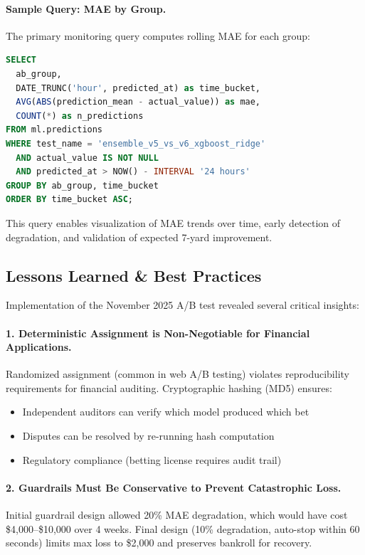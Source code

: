 \paragraph{Sample Query: MAE by Group.}
The primary monitoring query computes rolling MAE for each group:

\begin{lstlisting}[language=SQL, style=codestyle, caption={Grafana query for real-time MAE monitoring}]
SELECT
  ab_group,
  DATE_TRUNC('hour', predicted_at) as time_bucket,
  AVG(ABS(prediction_mean - actual_value)) as mae,
  COUNT(*) as n_predictions
FROM ml.predictions
WHERE test_name = 'ensemble_v5_vs_v6_xgboost_ridge'
  AND actual_value IS NOT NULL
  AND predicted_at > NOW() - INTERVAL '24 hours'
GROUP BY ab_group, time_bucket
ORDER BY time_bucket ASC;
\end{lstlisting}

This query enables visualization of MAE trends over time, early detection of degradation, and validation of expected 7-yard improvement.

\subsection{Lessons Learned \& Best Practices}

Implementation of the November 2025 A/B test revealed several critical insights:

\paragraph{1. Deterministic Assignment is Non-Negotiable for Financial Applications.}
Randomized assignment (common in web A/B testing) violates reproducibility requirements for financial auditing. Cryptographic hashing (MD5) ensures:
\begin{itemize}[itemsep=2pt,parsep=0pt]
    \item Independent auditors can verify which model produced which bet
    \item Disputes can be resolved by re-running hash computation
    \item Regulatory compliance (betting license requires audit trail)
\end{itemize}

\paragraph{2. Guardrails Must Be Conservative to Prevent Catastrophic Loss.}
Initial guardrail design allowed 20\% MAE degradation, which would have cost \$4,000--\$10,000 over 4 weeks. Final design (10\% degradation, auto-stop within 60 seconds) limits max loss to \$2,000 and preserves bankroll for recovery.

